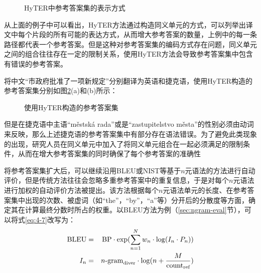 \begin{figure}[htp]
    \centering
	
   \caption{HyTER中参考答案集的表示方式}
   \label{fig:4-7}
\end{figure}

\parinterval 从上面的例子中可以看出，HyTER方法通过构造同义单元的方式，可以列举出译文中每个片段的所有可能的表达方式，从而增大参考答案的数量，上例中的每一条路径都代表一个参考答案。但是这种对参考答案集的编码方式存在问题，同义单元之间的组合往往存在一定的限制关系，使用HyTER方法会导致参考答案集中包含有错误的参考答案。

\begin{example}
将中文“市政府批准了一项新规定”分别翻译为英语和捷克语，使用HyTER构造的参考答案集分别如图\ref{fig:4-8}(a)和(b)所示：
\label{eg:4-6}
\end{example}

\begin{figure}[htp]
    \centering
\subfigure[英语参考答案集表示]{}
\subfigure[捷克语参考答案集表示]{}
   \caption{使用HyTER构造的参考答案集}
   \label{fig:4-8}
\end{figure}

\parinterval 但是在捷克语中主语“městská rada”或是“zastupitelstvo města”的性别必须由动词来反映，那么上述捷克语的参考答案集中有部分存在语法错误。为了避免此类现象的出现，研究人员在同义单元中加入了将同义单元组合在一起必须满足的限制条件，从而在增大参考答案集的同时确保了每个参考答案的准确性

\parinterval 将参考答案集扩大后，可以继续沿用BLEU或NIST等基于$n$元语法的方法进行自动评价，但是传统方法往往会忽略多重参考答案中的重复信息，于是对每个$n$元语法进行加权的自动评价方法被提出。该方法根据每个$n$元语法单元的长度、在参考答案集中出现的次数、被虚词（如“the”，“by”，“a”等）分开后的分散度等方面，确定其在计算最终分数时所占的权重。以BLEU方法为例（\ref{sec:ngram-eval}节），可以将式\eqref{eq:4-7}改写为：
\begin{eqnarray}
\textrm{BLEU} &=& \textrm {BP} \cdot {\textrm{exp}}(\sum\limits_{n = 1}^N {{w_n} \cdot \log ({I}_n \cdot {P}_n} ))
\label{eq:4-14}\\
{I}_n &=& n\textrm{-gram}_{\textrm {diver}} \cdot \log (n + \frac{M}{\textrm{count}_{\textrm{ref}}})
\label{eq:4-15}
\end{eqnarray}

